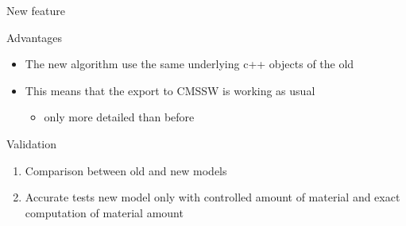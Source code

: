 \documentclass[pdftex, 11pt]{beamer}
\begin{document}
\begin{frame}{New feature}
\begin{center}
  \end{center}
\end{frame}

\begin{frame}{Advantages}
  \begin{itemize}
  \item The new algorithm use the \alert{same} underlying c++ objects of the old
    \pause
  \item This means that the \alert{export} to \alert{CMSSW} is working as usual
    \begin{itemize}
    \item only more \alert{detailed} than before
    \end{itemize}
  \end{itemize}
\end{frame}

\begin{frame}{Validation}
  \begin{enumerate}
  \item \alert{Comparison} between old and new models
    \pause
  \item Accurate \alert{tests} new model only with controlled amount of material and exact computation of material amount
  \end{enumerate}
\end{frame}
\end{document}
